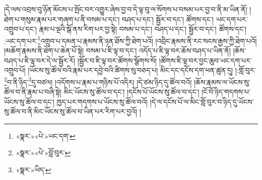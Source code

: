།དེ་ལས་འབྲས་བུ་ཉོན་མོངས་པ་སྤོང་བར་འགྱུར་ཞེས་བྱ་བ་དེ་ལྟ་བུ་ལ་སོགས་པ་བསམ་པར་བྱ་བ་ནི་མ་ཡིན་ནོ། །ཐེག་པ་གསུམ་རྣམ་པར་གཞག་པ་ནི་བསམ་པ་དང་། བཤད་པ་དང་། སྦྱོར་བ་དང་། ཚོགས་དང་། ཡང་དག་པར་འགྲུབ་པ་དང་། རྣམ་པ་ལྔའི་སྒོ་ནས་རིག་པར་བྱ་སྟེ། བསམ་པ་དང་། བཤད་པ་དང་། སྦྱོར་བ་དང་། ཚོགས་དང་། :ཡང་དག་པར་\footnote{«སྣར་»«པེ་»ཡང་དག་}འགྲུབ་པ་དམན་པ་རྣམས་ནི་ཉན་ཐོས་ཀྱི་ཐེག་པའོ། །འབྲིང་རྣམས་ནི་རང་སངས་རྒྱས་ཀྱི་ཐེག་པའོ། །མཆོག་རྣམས་ནི་ཐེག་པ་ཆེན་པོ་སྟེ། བསམ་པ་ཇི་ལྟ་བ་དང་། འདོད་པ་ཇི་ལྟ་བར་ཆོས་བཤད་པ་ཡིན་ནོ། །ཆོས་བཤད་པ་ཇི་ལྟ་བར་དེ་ལ་སྦྱོར་རོ། །སྦྱོར་བ་ཇི་ལྟ་བར་ཚོགས་སྩོགས་སོ། །ཚོགས་ཇི་ལྟ་བར་བྱང་ཆུབ་ཡང་དག་པར་འགྲུབ་པོ། །ཡོངས་སུ་ཚོལ་བའི་རྣམ་པར་དབྱེ་བའི་ཚིགས་སུ་བཅད་པ། མིང་དང་དངོས་དག་ཕན་ཚུན་དུ། །:གློ་བུར་\footnote{«སྣར་»«པེ་»བློ་བུར་}བ་ནི་ཉིད་\footnote{«སྣར་»ཡིད་}དུ་བཙལ། །འདོགས་པ་རྣམ་པ་གཉིས་པོ་འདིར། །དེ་ཙམ་ཉིད་དུ་ཚོལ་བའོ། །ཆོས་རྣམས་ལ་ཡོངས་སུ་ཚོལ་བ་ནི་རྣམ་པ་བཞི་སྟེ། མིང་ཡོངས་སུ་ཚོལ་བ་དང་། །དངོས་པོ་ཡོངས་སུ་ཚོལ་བ་དང་། །ངོ་བོ་ཉིད་གདགས་པ་ཡོངས་སུ་ཚོལ་བ་དང་། ཁྱད་པར་གདགས་པ་ཡོངས་སུ་ཚོལ་བའོ། །དེ་ལ་དངོས་པོ་ལ་མིང་གློ་བུར་བ་ཉིད་དུ་ཡོངས་སུ་ཚོལ་བ་ནི་མིང་ཡོངས་སུ་ཚོལ་བ་ཡིན་པར་རིག་པར་བྱའོ། །
